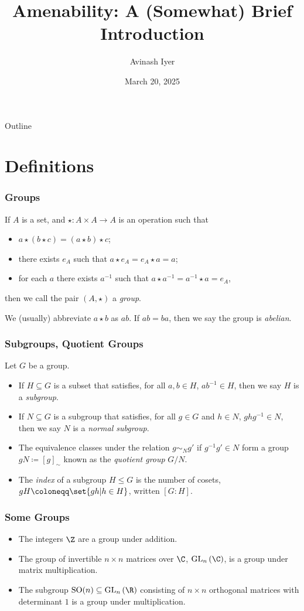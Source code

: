 \documentclass{beamer-custom}
\title{Amenability: A (Somewhat) Brief Introduction}
\author{Avinash Iyer}
\institute{Occidental College}
\date{March 20, 2025}
\begin{document}
\begin{frame}
    \titlepage
\end{frame}

\begin{frame}{Outline}
    \tableofcontents
\end{frame}
\section{Definitions}%
\begin{frame}
  \frametitle{Groups}
  If $A$ is a set, and $\star\colon A\times A \rightarrow A$ is an operation such that
  \begin{itemize}
    \item $a\star\left(b\star c\right) = \left(a\star b\right)\star c$;
    \item there exists $e_A$ such that $a\star e_A = e_A\star a = a$;
    \item for each $a$ there exists $a^{-1}$ such that $a\star a^{-1} = a^{-1}\star a = e_A$,
  \end{itemize}
  then we call the pair $\left(A,\star\right)$ a \textit{group}.\pause\hfill\break

  We (usually) abbreviate $a\star b$ as $ab$. If $ab = ba$, then we say the group is \textit{abelian}.
\end{frame}
\begin{frame}
  \frametitle{Subgroups, Quotient Groups}
  Let $G$ be a group.
  \begin{itemize}
    \item If $H\subseteq G$ is a subset that satisfies, for all $a,b\in H$, $ab^{-1}\in H$, then we say $H$ is a \textit{subgroup}.\pause
    \item If $N\subseteq G$ is a subgroup that satisfies, for all $g\in G$ and $h\in N$, $ghg^{-1}\in N$, then we say $N$ is a \textit{normal subgroup}.\pause
    \item The equivalence classes under the relation $g\sim_{N} g'$ if $g^{-1}g' \in N$ form a group $gN\coloneqq \left[ g \right]_{\sim}$ known as the \textit{quotient group} $G/N$.
    \item The \textit{index} of a subgroup $H\leq G$ is the number of cosets, $gH\coloneqq \set{gh | h\in H}$, written $\left[ G:H \right]$.
  \end{itemize}
\end{frame}
\begin{frame}
  \frametitle{Some Groups}
  \begin{itemize}
    \item The integers $\Z$ are a group under addition.
    \item The group of invertible $n\times n$ matrices over $\C$, $\text{GL}_{n}\left(\C\right)$, is a group under matrix multiplication.
    \item The subgroup $\text{SO}(n)\subseteq \text{GL}_{n}\left( \R \right)$ consisting of $n\times n$ orthogonal matrices with determinant $1$ is a group under multiplication.
  \end{itemize}
\end{frame}
\end{document}
